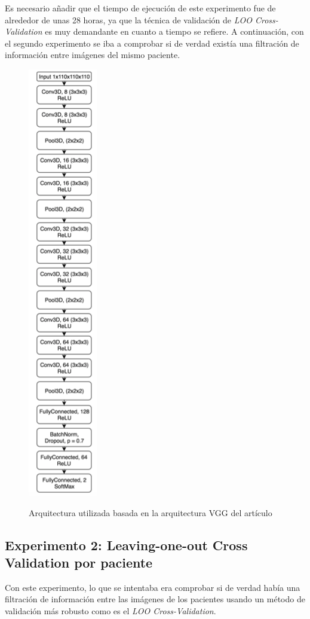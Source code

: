 Es necesario añadir que el tiempo de ejecución de este experimento fue de alrededor de unas 28 horas, ya que la técnica de validación de \textit{LOO Cross-Validation} es muy demandante en cuanto a tiempo se refiere. A continuación, con el segundo experimento se iba a comprobar si de verdad existía una filtración de información entre imágenes del mismo paciente.\\
\newpage
\begin{figure}[H]
	\centering
	\caption{Arquitectura utilizada basada en la arquitectura VGG \cite{SimonyanZ14a} del artículo \cite{residualVGG}}
	\includegraphics[height=\textheight]{imagenes/model.png}
	\label{arquitectura}
\end{figure}

\subsection{Experimento 2: Leaving-one-out Cross Validation por paciente}
\label{exp2}
Con este experimento, lo que se intentaba era comprobar si de verdad había una filtración de información entre las imágenes de los pacientes usando un método de validación más robusto como es el \textit{LOO Cross-Validation}.\\

